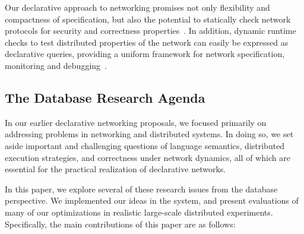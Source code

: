 Our declarative approach to networking promises not only flexibility
and compactness of specification, but also the potential to statically
check network protocols for security and correctness
properties~\cite{feamster05}. In addition, dynamic runtime checks to
test distributed properties of the network can easily be expressed as
declarative queries, providing a
uniform framework for network specification, monitoring and
debugging~\cite{singhEurosys}.


% 

\subsection{The Database Research Agenda}
In our earlier declarative networking proposals, we focused primarily
on addressing problems in networking and distributed systems. In doing
so, we set aside important and challenging questions of language
semantics, distributed execution strategies, and correctness under
network dynamics, all of which are essential for the practical
realization of declarative networks.

In this paper, we explore several of these research issues from the
database perspective. We implemented our ideas in the \Sys system, and
present evaluations of many of our optimizations in realistic
large-scale distributed experiments. Specifically, the main
contributions of this paper are as follows:

